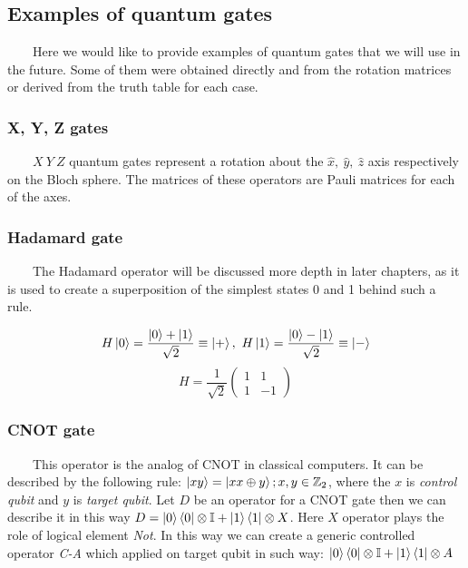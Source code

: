 \documentclass[english,14pt,a4paper]{article}
\begin{document}
	\subsection{Examples of quantum gates} \ \ \ \ 
	Here we would like to provide examples of quantum gates that we will use in the future. Some of them were obtained directly and from the rotation matrices or derived from the truth table for each case. 
	
	\subsubsection{X, Y, Z gates}\ \ \ \
	\(X  \ Y \ Z\) quantum gates represent a rotation about the $\hat{x}, \ \hat{y}, \ \hat{z}$ axis respectively on the Bloch sphere. The matrices of these operators are Pauli matrices for each of the axes. 
	
	\subsubsection{Hadamard gate}\ \ \ \
	The Hadamard operator will be discussed more depth in later chapters, as it is used to create a superposition of the simplest states 0 and 1 behind such a rule. 
	
	\[
		H \ket{0} = \frac{\ket{0} + \ket{1}}{\sqrt{2}} \equiv \ket{+}, \ H \ket{1} = \frac{\ket{0} - \ket{1}}{\sqrt{2}} \equiv \ket{-}
	\]
	\begin{equation}
	H = \frac{1}{\sqrt{2}} \begin{pmatrix} 1 & 1 \\ 1 & -1 \end{pmatrix}
	\end{equation}
	
	\subsubsection{CNOT gate}\ \ \ \
	This operator is the analog of CNOT in classical computers. It can be described by the following rule: $\ket{xy} = \ket{x x \oplus y}; x, y \in \mathbb{Z}_2$, where the $x$ is \textit{control qubit} and $y$ is \textit{target qubit}. Let $D$ be an operator for a CNOT gate then we can describe it in this way $D = \ket{0}\bra{0} \otimes \mathbb{I} + \ket{1}\bra{1} \otimes X$. Here $X$ operator plays the role of logical element \textit{Not}. In this way we can create a generic controlled operator \textit{C-A} which applied on target qubit in such way: $\ket{0}\bra{0} \otimes \mathbb{I} + \ket{1}\bra{1} \otimes A $
\end{document}
